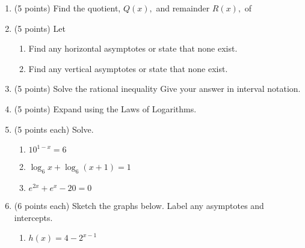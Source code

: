 \documentclass[12pt]{article}
\begin{document}
\begin{enumerate}
\begin{flushright}
\end{flushright}
\newpage
\item (5 points) Find the quotient, $Q(x),$ and remainder  $R(x),$ of 
\vfill
\item (5 points) Let 
\begin{enumerate}
\item Find any horizontal asymptotes or state that none exist.
\vspace{.6in}
\item Find any vertical asymptotes or state that none exist.
\vspace{.6in}
\end{enumerate}
\item (5 points) Solve the rational inequality  Give your answer in interval notation.
\vfill
\newpage
\item (5 points) Expand  using the Laws of Logarithms.
\vfill
\item (5 points each) Solve.
\begin{enumerate}
\item $10^{1-x}=6$
\vfill
\item $\log_6 x +\log_6 (x+1)=1$
\vfill
\item $e^{2x}+e^{x}-20=0$
\vfill
\end{enumerate}
\newpage
\item (6 points each) Sketch the graphs below. Label any asymptotes and intercepts.
\begin{enumerate}
\item 
\begin{minipage}[l]{7cm}
$h(x)=4-2^{x-1}$
\end{minipage}%
\begin{minipage}[c]{10cm}

\end{minipage}
\end{enumerate}
\end{enumerate}
\end{document}
